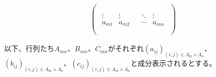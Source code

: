 \documentclass[dvipdfmx]{jsarticle}
\begin{document}
\begin{dfn}
\begin{align*}
\begin{pmatrix}
\begin{matrix}
\end{matrix} \\
\begin{matrix}
 \vdots & \vdots \\
a_{m1} & a_{m2} \\
\end{matrix} & \begin{matrix}
 \ddots & \vdots \\
\cdots & a_{mn} \\
\end{matrix} \\
\end{pmatrix}
\end{align*}\par
以下、行列たち$A_{mn}$、$B_{mn}$、$C_{mn}$がそれぞれ$\left( a_{ij} \right)_{(i,j) \in \varLambda_{m} \times \varLambda_{n}}$、$\left( b_{ij} \right)_{(i,j) \in \varLambda_{m} \times \varLambda_{n}}$、$\left( c_{ij} \right)_{(i,j) \in \varLambda_{m} \times \varLambda_{n}}$と成分表示されるとする。
\end{dfn}
\end{document}
